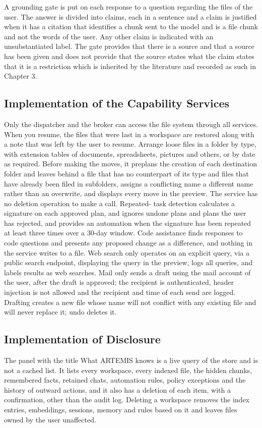 \documentclass{FastFyp}
\begin{document}
A grounding gate is put on each response to a question regarding the files of the user. The answer is divided into claims, each in a sentence and a claim is justified when it has a citation that identifies a chunk sent to the model and is a file chunk and not the words of the user. Any other claim is indicated with an unsubstantiated label. The gate provides that there is a source and that a source has been given and does not provide that the source states what the claim states that it is a restriction which is inherited by the literature and recorded as such in Chapter 3.

\subsection{Implementation of the Capability Services}
Only the dispatcher and the broker can access the file system through all services. When you resume, the files that were last in a workspace are restored along with a note that was left by the user to resume. Arrange loose files in a folder by type, with extension tables of documents, spreadsheets, pictures and others, or by date as required. Before making the moves, it preplans the creation of each destination folder and leaves behind a file that has no counterpart of its type and files that have already been filed in subfolders, assigns a conflicting name a different name rather than an overwrite, and displays every move in the preview. The service has no deletion operation to make a call. Repeated- task detection calculates a signature on each approved plan, and ignores undone plans and plans the user has rejected, and provides an automation when the signature has been repeated at least three times over a 30-day window. Code assistance finds responses to code questions and presents any proposed change as a difference, and nothing in the service writes to a file. Web search only operates on an explicit query, via a public search endpoint, displaying the query in the preview, logs all queries, and labels results as web searches. Mail only sends a draft using the mail account of the user, after the draft is approved; the recipient is authenticated, header injection is not allowed and the recipient and time of each send are logged. Drafting creates a new file whose name will not conflict with any existing file and will never replace it; undo deletes it.

\subsection{Implementation of Disclosure}
The panel with the title What ARTEMIS knows is a live query of the store and is not a cached list. It lists every workspace, every indexed file, the hidden chunks, remembered facts, retained chats, automation rules, policy exceptions and the history of outward actions, and it also has a deletion of each item, with a confirmation, other than the audit log. Deleting a workspace removes the index entries, embeddings, sessions, memory and rules based on it and leaves files owned by the user unaffected.
\end{document}
